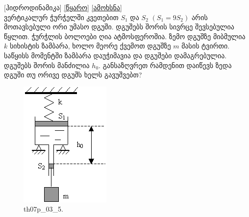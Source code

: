 \documentclass{article}
\begin{document}
[ჰიდროდინამიკა] \href{https://www.physolymp.spb.ru/index.php/archive/2003/245}{[წყარო]} \href{https://www.physolymp.spb.ru/index.php/archive/2003/240}{[ამოხსნა]} \\
ვერტიკალურ ჭურჭელში კვეთებით $S_1$ და $S_2$ $(S_1=9S_2)$ არის მოთავსებული ორი უმასო დგუში. დგუშებს შორის სივრცე შევსებულია წყლით. ჭურჭლის ბოლოები ღია ატმოსფეროშია. ზემო დგუშზე მიბმულია $k$ სიხისტის ზამბარა, ხოლო მეორე ქვემოთ დგუშზე $m$ მასის ტვირთი. საწყისს მომენტში ზამბარა დაუჭიმავია და დგუშები დამაგრებულია. დგუშებს შორის მანძილია $h_0$. განსაზღვრეთ რამდენით დაიწევს ზედა დგუში თუ ორივე დგუშს ხელს გავუშვებთ?
	\begin{figure}[H]
		\centering
		\includegraphics[width=0.2\columnwidth]{images/th07p_03_5}
		\caption{th07p_03_5.}
		\label{fig:th07p_03_5}
	\end{figure}
\end{document}

